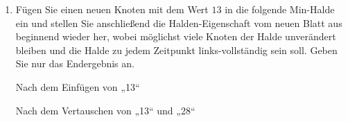 \documentclass{bschlangaul-aufgabe}
\begin{document}
\begin{enumerate}
\begin{bAntwort}
\begin{minipage}{0.5\linewidth}
\end{minipage}
\begin{minipage}{0.5\linewidth}
\end{minipage}
\end{bAntwort}


\item Fügen Sie einen neuen Knoten mit dem Wert $13$ in die folgende
Min-Halde ein und stellen Sie anschließend die Halden-Eigenschaft vom
neuen Blatt aus beginnend wieder her, wobei möglichst viele Knoten der
Halde unverändert bleiben und die Halde zu jedem Zeitpunkt
links-vollständig sein soll. Geben Sie nur das Endergebnis an.

\begin{center}
\end{center}
\begin{bAntwort}

\begin{bBaum}{Nach dem Einfügen von „13“}

\end{bBaum}

\begin{bBaum}{Nach dem Vertauschen von „13“ und „28“}


\end{bBaum}
\end{bAntwort}
\end{enumerate}
\end{document}
